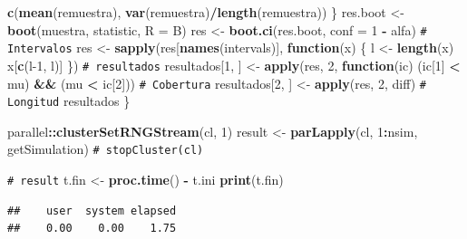 \documentclass[
]{book}
\newenvironment{Shaded}{\begin{snugshade}}{\end{snugshade}}
\newcommand{\AttributeTok}[1]{\textcolor[rgb]{0.13,0.29,0.53}{#1}}
\newcommand{\CommentTok}[1]{\textcolor[rgb]{0.56,0.35,0.01}{\textit{#1}}}
\newcommand{\ControlFlowTok}[1]{\textcolor[rgb]{0.13,0.29,0.53}{\textbf{#1}}}
\newcommand{\DecValTok}[1]{\textcolor[rgb]{0.00,0.00,0.81}{#1}}
\newcommand{\FunctionTok}[1]{\textcolor[rgb]{0.13,0.29,0.53}{\textbf{#1}}}
\newcommand{\NormalTok}[1]{#1}
\newcommand{\OtherTok}[1]{\textcolor[rgb]{0.56,0.35,0.01}{#1}}
\newcommand{\SpecialCharTok}[1]{\textcolor[rgb]{0.81,0.36,0.00}{\textbf{#1}}}
\theoremstyle{break}
\theoremstyle{nonumberplain}
\renewcommand{\CommentTok}[1]{\textcolor[rgb]{0.41,0.41,0.41}{\texttt{#1}}}
\begin{document}
\begin{Shaded}
\begin{Highlighting}[]
      \FunctionTok{c}\NormalTok{(}\FunctionTok{mean}\NormalTok{(remuestra), }\FunctionTok{var}\NormalTok{(remuestra)}\SpecialCharTok{/}\FunctionTok{length}\NormalTok{(remuestra))}
\NormalTok{    \}}
\NormalTok{    res.boot }\OtherTok{\textless{}{-}} \FunctionTok{boot}\NormalTok{(muestra, statistic, }\AttributeTok{R =}\NormalTok{ B)}
\NormalTok{    res }\OtherTok{\textless{}{-}} \FunctionTok{boot.ci}\NormalTok{(res.boot, }\AttributeTok{conf =} \DecValTok{1} \SpecialCharTok{{-}}\NormalTok{ alfa)}
    \CommentTok{\# Intervalos}
\NormalTok{    res }\OtherTok{\textless{}{-}} \FunctionTok{sapply}\NormalTok{(res[}\FunctionTok{names}\NormalTok{(intervals)], }\ControlFlowTok{function}\NormalTok{(x) \{}
\NormalTok{      l }\OtherTok{\textless{}{-}} \FunctionTok{length}\NormalTok{(x)}
\NormalTok{      x[}\FunctionTok{c}\NormalTok{(l}\DecValTok{{-}1}\NormalTok{, l)]}
\NormalTok{    \})}
    \CommentTok{\# resultados}
\NormalTok{    resultados[}\DecValTok{1}\NormalTok{, ] }\OtherTok{\textless{}{-}} \FunctionTok{apply}\NormalTok{(res, }\DecValTok{2}\NormalTok{,}
                                   \ControlFlowTok{function}\NormalTok{(ic) (ic[}\DecValTok{1}\NormalTok{] }\SpecialCharTok{\textless{}}\NormalTok{ mu) }\SpecialCharTok{\&\&}\NormalTok{ (mu }\SpecialCharTok{\textless{}}\NormalTok{ ic[}\DecValTok{2}\NormalTok{])) }\CommentTok{\# Cobertura}
\NormalTok{    resultados[}\DecValTok{2}\NormalTok{, ] }\OtherTok{\textless{}{-}} \FunctionTok{apply}\NormalTok{(res, }\DecValTok{2}\NormalTok{, diff) }\CommentTok{\# Longitud}
\NormalTok{    resultados}
\NormalTok{\}}

\NormalTok{parallel}\SpecialCharTok{::}\FunctionTok{clusterSetRNGStream}\NormalTok{(cl, }\DecValTok{1}\NormalTok{)}
\NormalTok{result }\OtherTok{\textless{}{-}} \FunctionTok{parLapply}\NormalTok{(cl, }\DecValTok{1}\SpecialCharTok{:}\NormalTok{nsim, getSimulation)}
\CommentTok{\# stopCluster(cl)}

\CommentTok{\# result}
\NormalTok{t.fin }\OtherTok{\textless{}{-}} \FunctionTok{proc.time}\NormalTok{() }\SpecialCharTok{{-}}\NormalTok{ t.ini}
\FunctionTok{print}\NormalTok{(t.fin)}
\end{Highlighting}
\end{Shaded}

\begin{verbatim}
##    user  system elapsed 
##    0.00    0.00    1.75
\end{verbatim}
\end{document}

